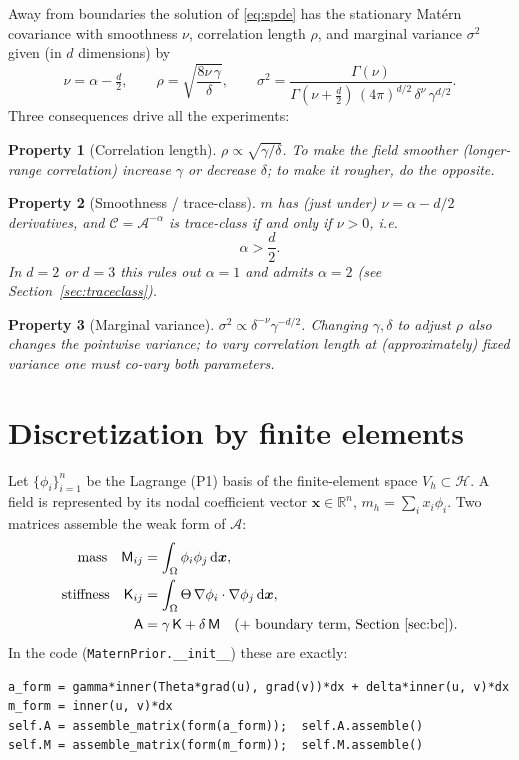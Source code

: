 \documentclass[11pt]{article}
\theoremstyle{definition}
\theoremstyle{plain}
\newtheorem{property}{Property}[section]
\theoremstyle{remark}
\newcommand{\R}{\mathbb{R}}
\newcommand{\grad}{\nabla}
\newcommand{\Cc}{\mathcal{C}}
\newcommand{\Ac}{\mathcal{A}}
\newcommand{\Hc}{\mathcal{H}}
\newcommand{\dd}{\,\mathrm{d}}
\newcommand{\Mmat}{\mathsf{M}}
\newcommand{\Amat}{\mathsf{A}}
\newcommand{\Kmat}{\mathsf{K}}
\newcommand{\bx}{\bm{x}}
\begin{document}
Away from boundaries the solution of \eqref{eq:spde} has the stationary
Mat\'ern covariance with smoothness $\nu$, correlation length $\rho$, and
marginal variance $\sigma^2$ given (in $d$ dimensions) by
\begin{equation}
  \nu = \alpha - \tfrac{d}{2}, \qquad
  \rho = \sqrt{\frac{8\nu\,\gamma}{\delta}}, \qquad
  \sigma^2 = \frac{\Gamma(\nu)}{\Gamma(\nu+\tfrac{d}{2})\,
             (4\pi)^{d/2}\,\delta^{\nu}\,\gamma^{d/2}}.
  \label{eq:matern}
\end{equation}
Three consequences drive all the experiments:
\begin{property}[Correlation length]\label{prop:rho}
$\rho \propto \sqrt{\gamma/\delta}$. To make the field \emph{smoother}
(longer-range correlation) increase $\gamma$ or decrease $\delta$; to make it
rougher, do the opposite.
\end{property}
\begin{property}[Smoothness / trace-class]\label{prop:nu}
$m$ has (just under) $\nu = \alpha - d/2$ derivatives, and $\Cc = \Ac^{-\alpha}$
is trace-class if and only if $\nu > 0$, i.e.
\[
  \alpha > \frac{d}{2}.
\]
In $d=2$ or $d=3$ this rules out $\alpha=1$ and admits $\alpha=2$
(see Section~\ref{sec:traceclass}).
\end{property}
\begin{property}[Marginal variance]\label{prop:var}
$\sigma^2 \propto \delta^{-\nu}\gamma^{-d/2}$. Changing $\gamma,\delta$ to
adjust $\rho$ also changes the pointwise variance; to vary correlation length
at (approximately) fixed variance one must co-vary both parameters.
\end{property}

\section{Discretization by finite elements}

Let $\{\phi_i\}_{i=1}^{n}$ be the Lagrange (P1) basis of the finite-element
space $V_h \subset \Hc$. A field is represented by its nodal coefficient
vector $\bx \in \R^n$, $m_h = \sum_i x_i\phi_i$. Two matrices assemble the
weak form of $\Ac$:
\begin{align}
  \text{mass}\quad      \Mmat_{ij} &= \int_\Omega \phi_i\phi_j \dd\bx, \\
  \text{stiffness}\quad \Kmat_{ij} &= \int_\Omega
        \Theta\,\grad\phi_i \cdot \grad\phi_j \dd\bx, \\
  \Amat &= \gamma\,\Kmat + \delta\,\Mmat
           \quad (+\ \text{boundary term, Section~\ref{sec:bc}}).
  \label{eq:Amatrix}
\end{align}
In the code (\texttt{MaternPrior.\_\_init\_\_}) these are exactly:
\begin{lstlisting}
a_form = gamma*inner(Theta*grad(u), grad(v))*dx + delta*inner(u, v)*dx
m_form = inner(u, v)*dx
self.A = assemble_matrix(form(a_form));  self.A.assemble()
self.M = assemble_matrix(form(m_form));  self.M.assemble()
\end{lstlisting}
\end{document}
